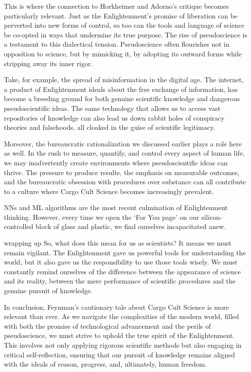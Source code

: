 This is where the connection to Horkheimer and Adorno's critique becomes
particularly relevant. Just as the Enlightenment's promise of liberation can be
perverted into new forms of control, so too can the tools and language of
science be co-opted in ways that undermine its true purpose. The rise of
pseudoscience is a testament to this dialectical tension. Pseudoscience often
flourishes not in opposition to science, but by mimicking it, by adopting its
outward forms while stripping away its inner rigor.

Take, for example, the spread of misinformation in the digital age. The
internet, a product of Enlightenment ideals about the free exchange of
information, has become a breeding ground for both genuine scientific knowledge
and dangerous pseudoscientific ideas. The same technology that allows us to
access vast repositories of knowledge can also lead us down rabbit holes of
conspiracy theories and falsehoods, all cloaked in the guise of scientific
legitimacy.

Moreover, the bureaucratic rationalization we discussed earlier plays a role
here as well. In the rush to measure, quantify, and control every aspect of
human life, we may inadvertently create environments where pseudoscientific
ideas can thrive. The pressure to produce results, the emphasis on measurable
outcomes, and the bureaucratic obsession with procedures over substance can all
contribute to a culture where Cargo Cult Science becomes increasingly
prevalent.

NNs and ML algorithms are the most recent culmination of Enlightenment
thinking. However, every time we open the ‘For You page’ on our
silicon-controlled block of glass and plastic, we find ourselves incapacitated
anew.
\par{wrapping up}
So, what does this mean for us as scientists? It means we must remain vigilant.
The Enlightenment gave us powerful tools for understanding the world, but it
also gave us the responsibility to use those tools wisely. We must constantly
remind ourselves of the difference between the appearance of science and its
reality, between the mere performance of scientific procedures and the genuine
pursuit of knowledge.

In conclusion, Feynman’s cautionary tale about Cargo Cult Science is more
relevant than ever. As we navigate the complexities of the modern world, filled
with both the promise of technological advancement and the perils of
pseudoscience, we must strive to uphold the true spirit of the Enlightenment.
This involves not only applying rigorous scientific methods but also engaging
in critical self-reflection, ensuring that our pursuit of knowledge remains
aligned with the ideals of reason, progress, and, ultimately, human freedom.
